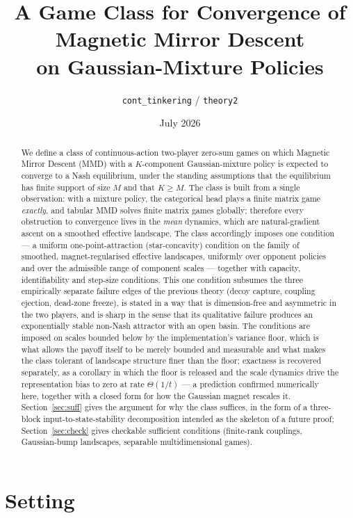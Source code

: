 \documentclass[11pt]{article}
\title{A Game Class for Convergence of Magnetic Mirror Descent\\
on Gaussian-Mixture Policies}
\author{\texttt{cont\_tinkering} / \texttt{theory2}}
\date{July 2026}
\theoremstyle{definition}
\begin{document}
\maketitle

\begin{abstract}
We define a class of continuous-action two-player zero-sum games on which
Magnetic Mirror Descent (MMD) with a $K$-component Gaussian-mixture policy is
expected to converge to a Nash equilibrium, under the standing assumptions that
the equilibrium has finite support of size $M$ and that $K \ge M$. The class is
built from a single observation: with a mixture policy, the categorical head
plays a finite matrix game \emph{exactly}, and tabular MMD solves finite matrix
games globally; therefore every obstruction to convergence lives in the
\emph{mean} dynamics, which are natural-gradient ascent on a smoothed effective
landscape. The class accordingly imposes one condition --- a uniform
one-point-attraction (star-concavity) condition on the family of smoothed,
magnet-regularised effective landscapes, uniformly over opponent policies and
over the admissible range of component scales --- together with capacity,
identifiability and step-size conditions. This one condition subsumes the three
empirically separate failure edges of the previous theory (decoy capture,
coupling ejection, dead-zone freeze), is stated in a way that is dimension-free
and asymmetric in the two players, and is sharp in the sense that its qualitative
failure produces an exponentially stable non-Nash attractor with an open basin.
The conditions are imposed on scales bounded below by the implementation's
variance floor, which is what allows the payoff itself to be merely bounded and
measurable and what makes the class tolerant of landscape structure finer than
the floor; exactness is recovered separately, as a corollary in which the floor
is released and the scale dynamics drive the representation bias to zero at rate
$\Theta(1/t)$ --- a prediction confirmed numerically here, together with a closed
form for how the Gaussian magnet rescales it. Section~\ref{sec:suff} gives the argument for why the class suffices,
in the form of a three-block input-to-state-stability decomposition intended as
the skeleton of a future proof; Section~\ref{sec:check} gives checkable
sufficient conditions (finite-rank couplings, Gaussian-bump landscapes, separable
multidimensional games).
\end{abstract}

\tableofcontents

\section{Setting}
\end{document}

